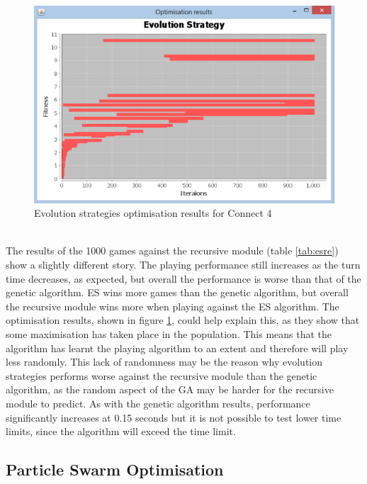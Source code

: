 \begin{figure}[tp]
   \begin{center}
     \includegraphics{Figures/esconnect4}
   \end{center}
   \caption{Evolution strategies optimisation results for Connect 4}
   \label{fig:esconnect4}
\end{figure} 
\\The results of the 1000 games against the recursive module (table \ref{tab:esre}) show a slightly different story. The playing performance still increases as the turn time decreases, as expected, but overall the performance is worse than that of the genetic algorithm. ES wins more games than the genetic algorithm, but overall the recursive module wins more when playing against the ES algorithm. The optimisation results, shown in figure \ref{fig:esconnect4}, could help explain this, as they show that some maximisation has taken place in the population. This means that the algorithm has learnt the playing algorithm to an extent and therefore will play less randomly. This lack of randomness may be the reason why evolution strategies performs worse against the recursive module than the genetic algorithm, as the random aspect of the GA may be harder for the recursive module to predict. As with the genetic algorithm results, performance significantly increases at 0.15 seconds but it is not possible to test lower time limits, since the algorithm will exceed the time limit.

\subsection{Particle Swarm Optimisation}

